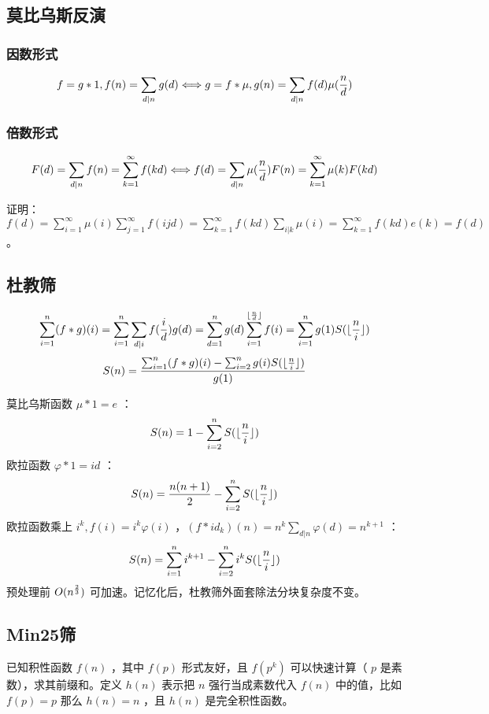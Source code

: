 

\subsection{莫比乌斯反演}

\subsubsection{因数形式}

$$
f=g*1,f(n)=\sum_{d|n}g(d) \Longleftrightarrow
g=f*\mu,g(n)=\sum_{d|n}f(d)\mu({n\over d})
$$

\subsubsection{倍数形式}

$$
F(d)=\sum_{d|n}f(n)=\sum_{k=1}^{\infty}f(kd) \Longleftrightarrow
f(d)=\sum_{d|n}\mu({n\over d})F(n)=\sum_{k=1}^{\infty}\mu(k)F(kd)
$$

证明：$f(d)=\sum_{i=1}^{\infty}\mu(i)\sum_{j=1}^{\infty}f(ijd)=\sum_{k=1}^{\infty}f(kd)\sum_{i|k}\mu(i)=\sum_{k=1}^{\infty}f(kd)e(k)=f(d)$ 。

\subsection{杜教筛}

$$
\sum_{i=1}^{n}(f*g)(i)=\sum_{i=1}^{n}\sum_{d|i}f({i\over d})g(d)=\sum_{d=1}^{n}g(d)\sum_{i=1}^{\lfloor{n\over d}\rfloor}f(i)=\sum_{i=1}^{n}g(1)S(\lfloor{n\over i}\rfloor)
$$
$$
S(n)={\sum_{i=1}^{n}(f*g)(i)-\sum_{i=2}^{n}g(i)S(\lfloor{n\over i}\rfloor)\over g(1)}
$$

莫比乌斯函数 $\mu*1=e$ ：
$$
S(n)=1-\sum_{i=2}^{n}S(\lfloor{n\over i}\rfloor)
$$
欧拉函数 $\varphi*1=id$ ：
$$
S(n)={n(n+1)\over 2}-\sum_{i=2}^{n}S(\lfloor{n\over i}\rfloor)
$$
欧拉函数乘上 $i^k,f(i)=i^k\varphi(i)$ ，$(f*id_k)(n)=n^k\sum_{d|n}\varphi(d)=n^{k+1}$ ：
$$
S(n)=\sum_{i=1}^{n}i^{k+1}-\sum_{i=2}^{n}i^kS(\lfloor{n\over i}\rfloor)
$$
预处理前 $O(n^{2\over 3})$ 可加速。记忆化后，杜教筛外面套除法分块复杂度不变。



\subsection{Min25筛}

已知积性函数 $f(n)$ ，其中 $f(p)$ 形式友好，且 $f(p^k)$ 可以快速计算（ $p$ 是素数），求其前缀和。定义 $h(n)$ 表示把 $n$ 强行当成素数代入 $f(n)$ 中的值，比如 $f(p)=p$ 那么 $h(n)=n$ ，且 $h(n)$ 是完全积性函数。

